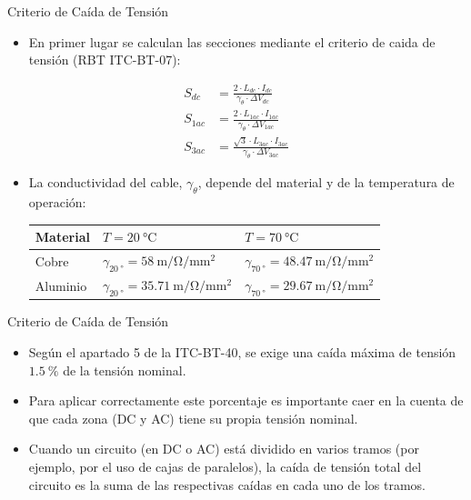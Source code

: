 \documentclass[aspectratio=169, usenames,svgnames,dvipsnames]{beamer}
\begin{document}
\begin{frame}[label={sec:org7571cd1}]{Criterio de Caída de Tensión}
\begin{itemize}
\item En primer lugar se calculan las secciones mediante el criterio de caida de tensión (RBT ITC-BT-07):
\end{itemize}
\begin{align*}
    S_{dc} &=  \frac{2 \cdot L_{dc}\cdot I_{dc}}{\gamma_\theta \cdot \Delta V_{dc}}\\
    S_{1ac} &=  \frac{2\cdot L_{1ac}\cdot I_{1ac}}{\gamma_\theta \cdot \Delta V_{1ac}}\\
    S_{3ac} &= \frac{\sqrt{3} \cdot L_{3ac}\cdot I_{3ac}}{\gamma_\theta \cdot \Delta V_{3ac}}
  \end{align*}

\begin{itemize}
\item La conductividad del cable, \(\gamma_\theta\), depende del material y de la
temperatura de operación:

\begin{center}
\begin{tabular}{lll}
Material & \(T = \qty{20}{\celsius}\) & \(T = \qty{70}{\celsius}\)\\
\hline
Cobre & \(\gamma_{\qty{20}{\degree}} = \qty{58}{\meter\per\ohm\per\milli\meter\squared}\) & \(\gamma_{\qty{70}{\degree}} = \qty{48,47}{\meter\per\ohm\per\milli\meter\squared}\)\\
Aluminio & \(\gamma_{\qty{20}{\degree}} = \qty{35,71}{\meter\per\ohm\per\milli\meter\squared}\) & \(\gamma_{\qty{70}{\degree}} = \qty{29,67}{\meter\per\ohm\per\milli\meter\squared}\)\\
\end{tabular}
\end{center}
\end{itemize}
\end{frame}
\begin{frame}[label={sec:orge0a7746}]{Criterio de Caída de Tensión}
\vfill
\begin{itemize}
\item Según el apartado 5 de la ITC-BT-40, se exige una caída máxima de
tensión \(\qty{1.5}{\percent}\) de la tensión nominal.
\end{itemize}
\vfill
\begin{itemize}
\item Para aplicar correctamente este porcentaje es importante caer en la
cuenta de que \alert{cada zona (DC y AC) tiene su propia tensión nominal}.
\end{itemize}
\vfill
\begin{itemize}
\item Cuando un circuito (en DC o AC) está dividido en varios tramos (por
ejemplo, por el uso de cajas de paralelos), la caída de tensión
total del circuito es la suma de las respectivas caídas en cada uno
de los tramos.
\end{itemize}
\end{frame}
\end{document}
